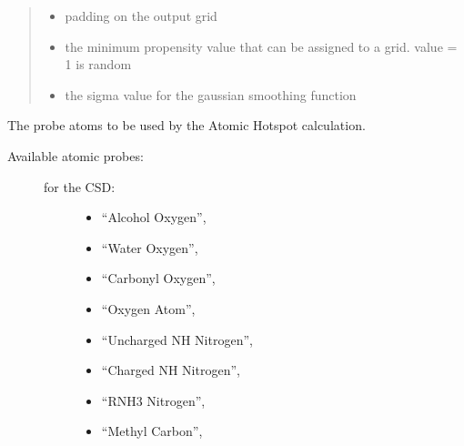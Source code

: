 \documentclass[letterpaper,10pt,english]{sphinxmanual}
\begin{document}
\begin{fulllineitems}
\begin{fulllineitems}
\begin{quote}
\begin{description}
\begin{itemize}
\item {} 
 \textendash{} padding on the output grid

\item {} 
 \textendash{} the minimum propensity value that can be assigned to a grid. value = 1 is random

\item {} 
 \textendash{} the sigma value for the gaussian smoothing function

\end{itemize}

\end{description}\end{quote}

\begin{fulllineitems}
\label{\detokenize{atomic_hotspot_calculation_api:hotspots.atomic_hotspot_calculation.AtomicHotspot.Settings.atomic_probes}}
The probe atoms to be used by the Atomic Hotspot calculation.
\begin{description}
\item[{Available atomic probes:}] \leavevmode\begin{description}
\item[{for the CSD:}] \leavevmode\begin{itemize}
\item {} 
“Alcohol Oxygen”,

\item {} 
“Water Oxygen”,

\item {} 
“Carbonyl Oxygen”,

\item {} 
“Oxygen Atom”,

\item {} 
“Uncharged NH Nitrogen”,

\item {} 
“Charged NH Nitrogen”,

\item {} 
“RNH3 Nitrogen”,

\item {} 
“Methyl Carbon”,


\end{itemize}
\end{description}
\end{description}
\end{fulllineitems}
\end{fulllineitems}
\end{fulllineitems}
\end{document}
